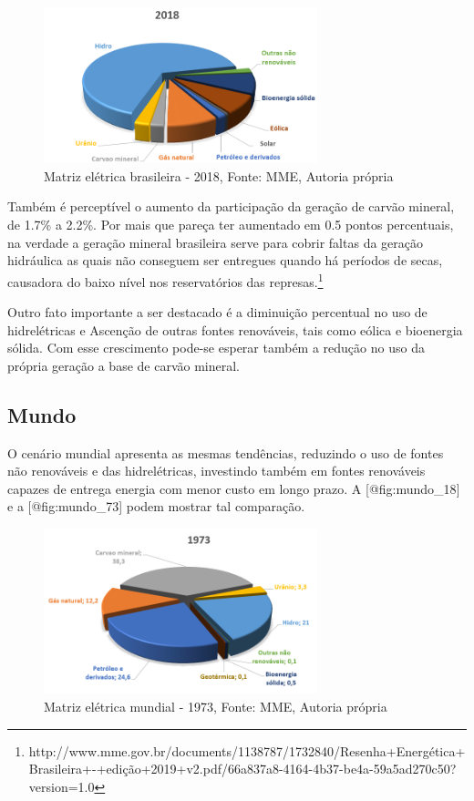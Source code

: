 \documentclass[
]{article}
\begin{document}
\begin{figure}
\hypertarget{fig:brasil_18}{%
\centering
\includegraphics[width=3.125in,height=\textheight]{img/matriz/brasil_18.png}
\caption{Matriz elétrica brasileira - 2018, Fonte: MME, Autoria
própria}\label{fig:brasil_18}
}
\end{figure}

Também é perceptível o aumento da participação da geração de carvão
mineral, de 1.7\% a 2.2\%. Por mais que pareça ter aumentado em 0.5
pontos percentuais, na verdade a geração mineral brasileira serve para
cobrir faltas da geração hidráulica as quais não conseguem ser entregues
quando há períodos de secas, causadora do baixo nível nos reservatórios
das represas.\footnote{http://www.mme.gov.br/documents/1138787/1732840/Resenha+Energética+Brasileira+-+edição+2019+v2.pdf/66a837a8-4164-4b37-be4a-59a5ad270c50?version=1.0}

Outro fato importante a ser destacado é a diminuição percentual no uso
de hidrelétricas e Ascenção de outras fontes renováveis, tais como
eólica e bioenergia sólida. Com esse crescimento pode-se esperar também
a redução no uso da própria geração a base de carvão mineral.

\hypertarget{mundo}{%
\subsection{Mundo}\label{mundo}}

O cenário mundial apresenta as mesmas tendências, reduzindo o uso de
fontes não renováveis e das hidrelétricas, investindo também em fontes
renováveis capazes de entrega energia com menor custo em longo prazo. A
{[}@fig:mundo\_18{]} e a {[}@fig:mundo\_73{]} podem mostrar tal
comparação.

\begin{figure}
\hypertarget{fig:mundo_73}{%
\centering
\includegraphics[width=3.125in,height=\textheight]{img/matriz/mundo_73.png}
\caption{Matriz elétrica mundial - 1973, Fonte: MME, Autoria
própria}\label{fig:mundo_73}
}
\end{figure}
\end{document}
